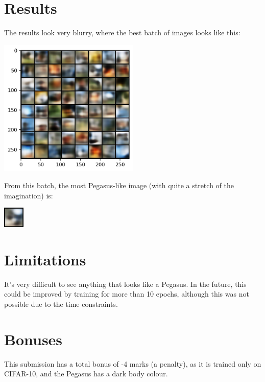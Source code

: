 \documentclass{article}
\begin{document}
\section{Results}
The results look very blurry, where the best batch of images looks like this:
\begin{center}
    \includegraphics[width=0.5\textwidth]{figures/best-batch.png}
\end{center}
From this batch, the most Pegasus-like image (with quite a stretch of the imagination) is:
\begin{center}
    \includegraphics[width=0.075\textwidth]{figures/best-pegasus.png}
\end{center}

\section{Limitations}
It's very difficult to see anything that looks like a Pegasus. In the future, this could be improved by training for more than 10 epochs, although this was not possible due to the time constraints.

\section*{Bonuses}
This submission has a total bonus of -4 marks (a penalty), as it is trained only on CIFAR-10, and the Pegasus has a dark body colour.

\printbibliography
\end{document}
